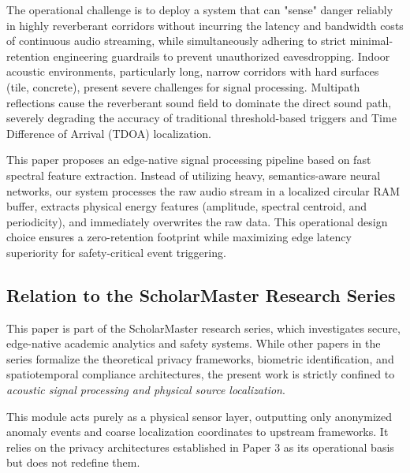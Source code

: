 \documentclass[conference]{IEEEtran}
\begin{document}
The operational challenge is to deploy a system that can "sense" danger reliably in highly reverberant corridors without incurring the latency and bandwidth costs of continuous audio streaming, while simultaneously adhering to strict minimal-retention engineering guardrails to prevent unauthorized eavesdropping. Indoor acoustic environments, particularly long, narrow corridors with hard surfaces (tile, concrete), present severe challenges for signal processing. Multipath reflections cause the reverberant sound field to dominate the direct sound path, severely degrading the accuracy of traditional threshold-based triggers and Time Difference of Arrival (TDOA) localization.

This paper proposes an edge-native signal processing pipeline based on fast spectral feature extraction. Instead of utilizing heavy, semantics-aware neural networks, our system processes the raw audio stream in a localized circular RAM buffer, extracts physical energy features (amplitude, spectral centroid, and periodicity), and immediately overwrites the raw data. This operational design choice ensures a zero-retention footprint while maximizing edge latency superiority for safety-critical event triggering.

\subsection{Relation to the ScholarMaster Research Series}
This paper is part of the ScholarMaster research series, which investigates secure, edge-native academic analytics and safety systems. While other papers in the series formalize the theoretical privacy frameworks, biometric identification, and spatiotemporal compliance architectures, the present work is strictly confined to \textit{acoustic signal processing and physical source localization}. 

This module acts purely as a physical sensor layer, outputting only anonymized anomaly events and coarse localization coordinates to upstream frameworks. It relies on the privacy architectures established in Paper 3 as its operational basis but does not redefine them.
\end{document}
